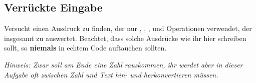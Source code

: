 \subsection{Verrückte Eingabe }

Versucht einen Ausdruck zu finden, der nur , ,
,  und Operationen verwendet, der
insgesamt zu  auswertet. Beachtet, dass solche Ausdrücke
wie ihr hier schreiben sollt, so \textbf{niemals} in echtem Code auftauchen
sollten.

\textit{Hinweis: Zwar soll am Ende eine Zahl rauskommen, ihr werdet aber in dieser Aufgabe oft zwischen Zahl und Text hin- und herkonvertieren müssen.}
